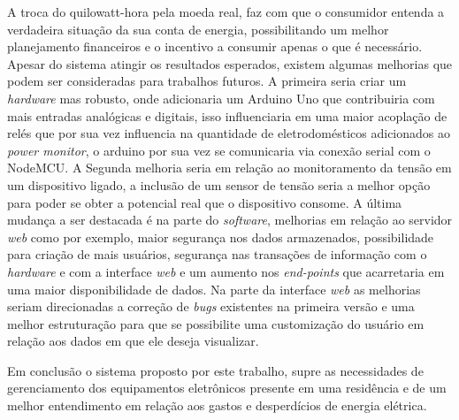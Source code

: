A troca do quilowatt-hora pela moeda real, faz com que o consumidor entenda a verdadeira situação da sua conta de energia, possibilitando um melhor planejamento
financeiros e o incentivo a consumir apenas o que é necessário. Apesar do sistema atingir os resultados esperados, existem algumas melhorias 
que podem ser consideradas para trabalhos futuros. A primeira seria criar um \textit{hardware} mas robusto, onde adicionaria um Arduino Uno
que contribuiria com mais entradas analógicas e digitais, isso influenciaria em uma maior acoplação de relés que por sua vez
influencia na quantidade de eletrodomésticos adicionados ao \textit{power monitor}, o arduino por sua vez se comunicaria via conexão serial 
com o NodeMCU. A Segunda melhoria seria em relação ao monitoramento da tensão em um dispositivo ligado, a inclusão de um sensor de tensão 
seria a melhor opção para poder se obter a potencial real que o dispositivo consome. A última mudança a ser destacada é na parte do 
\textit{software}, melhorias em relação ao servidor \textit{web} como por exemplo, maior segurança nos dados armazenados, possibilidade para criação
de mais usuários, segurança nas transações de informação com o \textit{hardware} e com a interface \textit{web} e um aumento nos \textit{end-points}
que acarretaria em uma maior disponibilidade de dados. Na parte da interface \textit{web} as melhorias seriam direcionadas a correção de \textit{bugs} 
existentes na primeira versão e uma melhor estruturação para que se possibilite uma customização do usuário em relação aos dados em que ele deseja visualizar.

Em conclusão o sistema proposto por este trabalho, supre as necessidades de gerenciamento dos equipamentos eletrônicos
presente em uma residência e de um melhor entendimento em relação aos gastos e desperdícios de energia elétrica.
